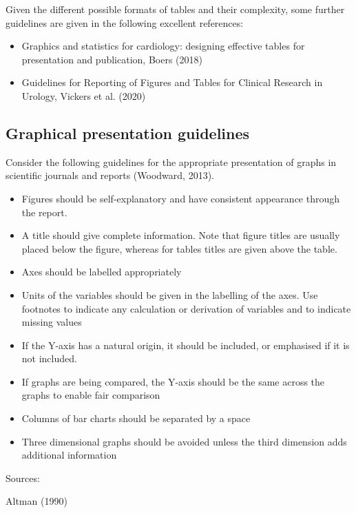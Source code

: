 \documentclass[
  a4paper,
]{memoir}
\providecommand{\tightlist}{%
  \setlength{\itemsep}{0pt}\setlength{\parskip}{0pt}}\usepackage{longtable,booktabs,array}
\begin{document}
Given the different possible formats of tables and their complexity,
some further guidelines are given in the following excellent references:

\begin{itemize}
\tightlist
\item
  Graphics and statistics for cardiology: designing effective tables for
  presentation and publication, Boers (2018)
\item
  Guidelines for Reporting of Figures and Tables for Clinical Research
  in Urology, Vickers et al. (2020)
\end{itemize}

\hypertarget{graphical-presentation-guidelines}{%
\subsection{Graphical presentation
guidelines}\label{graphical-presentation-guidelines}}

Consider the following guidelines for the appropriate presentation of
graphs in scientific journals and reports (Woodward, 2013).

\begin{itemize}
\tightlist
\item
  Figures should be self-explanatory and have consistent appearance
  through the report.
\item
  A title should give complete information. Note that figure titles are
  usually placed below the figure, whereas for tables titles are given
  above the table.
\item
  Axes should be labelled appropriately
\item
  Units of the variables should be given in the labelling of the axes.
  Use footnotes to indicate any calculation or derivation of variables
  and to indicate missing values
\item
  If the Y-axis has a natural origin, it should be included, or
  emphasised if it is not included.
\item
  If graphs are being compared, the Y-axis should be the same across the
  graphs to enable fair comparison
\item
  Columns of bar charts should be separated by a space
\item
  Three dimensional graphs should be avoided unless the third dimension
  adds additional information
\end{itemize}

Sources:

Altman (1990)
\end{document}
